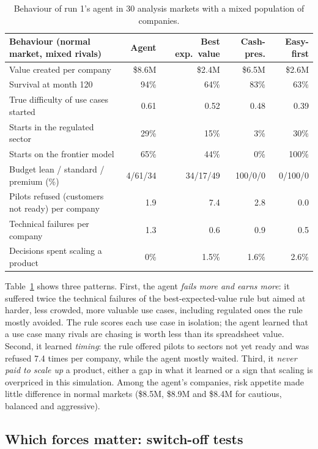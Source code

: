 \documentclass[11pt]{article}
\begin{document}
\begin{table}[h]
\centering
\small\setlength{\tabcolsep}{4pt}
\begin{tabular}{lrrrr}
\toprule
Behaviour (normal market, mixed rivals) & Agent & Best exp.\ value & Cash-pres. & Easy-first \\
\midrule
Value created per company & \$8.6M & \$2.4M & \$6.5M & \$2.6M \\
Survival at month 120 & 94\% & 64\% & 83\% & 63\% \\
True difficulty of use cases started & 0.61 & 0.52 & 0.48 & 0.39 \\
Starts in the regulated sector & 29\% & 15\% & 3\% & 30\% \\
Starts on the frontier model & 65\% & 44\% & 0\% & 100\% \\
Budget lean / standard / premium (\%) & 4/61/34 & 34/17/49 & 100/0/0 & 0/100/0 \\
Pilots refused (customers not ready) per company & 1.9 & 7.4 & 2.8 & 0.0 \\
Technical failures per company & 1.3 & 0.6 & 0.9 & 0.5 \\
Decisions spent scaling a product & 0\% & 1.5\% & 1.6\% & 2.6\% \\
\bottomrule
\end{tabular}
\caption{Behaviour of run 1's agent in 30 analysis markets with a mixed population of companies.}
\label{tab:behaviour}
\end{table}

Table~\ref{tab:behaviour} shows three patterns. First, the agent \emph{fails more and earns more}: it suffered twice the technical failures of the best-expected-value rule but aimed at harder, less crowded, more valuable use cases, including regulated ones the rule mostly avoided. The rule scores each use case in isolation; the agent learned that a use case many rivals are chasing is worth less than its spreadsheet value. Second, it learned \emph{timing}: the rule offered pilots to sectors not yet ready and was refused 7.4 times per company, while the agent mostly waited. Third, it \emph{never paid to scale up} a product, either a gap in what it learned or a sign that scaling is overpriced in this simulation. Among the agent's companies, risk appetite made little difference in normal markets (\$8.5M, \$8.9M and \$8.4M for cautious, balanced and aggressive).

\subsection{Which forces matter: switch-off tests}
\label{sec:ablation}
\end{document}
